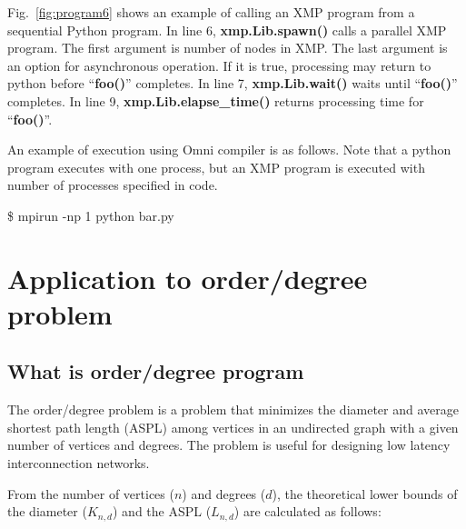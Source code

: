 \documentclass[graybox]{svmult}
\begin{document}

Fig.~\ref{fig:program6} shows an example of calling an XMP program from a sequential Python program.
In line 6, {\bf xmp.Lib.spawn()} calls a parallel XMP program.
The first argument is number of nodes in XMP.
The last argument is an option for asynchronous operation.
If it is true,  processing may return to python before ``{\bf foo()}'' completes.
In line 7, {\bf xmp.Lib.wait()} waits until ``{\bf foo()}'' completes.
In line 9, {\bf xmp.Lib.elapse\_time()} returns  processing time for ``{\bf foo()}''.

An example of execution using Omni compiler is as follows. 
Note that a python program executes with one process, but an XMP program is executed with number of processes specified in code.

\begin{svgraybox}
\$ mpirun -np 1 python bar.py
\end{svgraybox}

\section{Application to order/degree problem}
\subsection{What is order/degree program}
The order/degree problem is a problem that minimizes the diameter and average shortest path length (ASPL) among vertices in an undirected graph with a given number of vertices and degrees. 
The problem is useful for designing low latency interconnection networks\cite{graphgolf}.

From the number of vertices ($n$) and degrees ($d$), 
the theoretical lower bounds of the diameter ($K_{n,d}$) and the ASPL ($L_{n,d}$) are calculated as follows\cite{graphgolf,NET:NET3230040405}:
\end{document}

